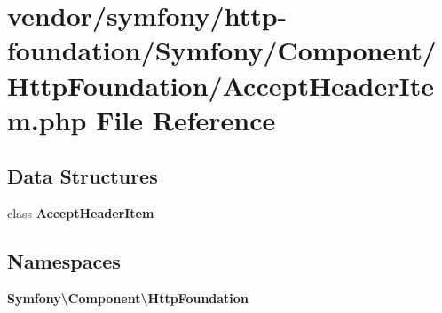 \section{vendor/symfony/http-\/foundation/\+Symfony/\+Component/\+Http\+Foundation/\+Accept\+Header\+Item.php File Reference}
\label{_accept_header_item_8php}
\subsection*{Data Structures}
\begin{DoxyCompactItemize}
\item 
class {\bf Accept\+Header\+Item}
\end{DoxyCompactItemize}
\subsection*{Namespaces}
\begin{DoxyCompactItemize}
\item 
 {\bf Symfony\textbackslash{}\+Component\textbackslash{}\+Http\+Foundation}
\end{DoxyCompactItemize}
